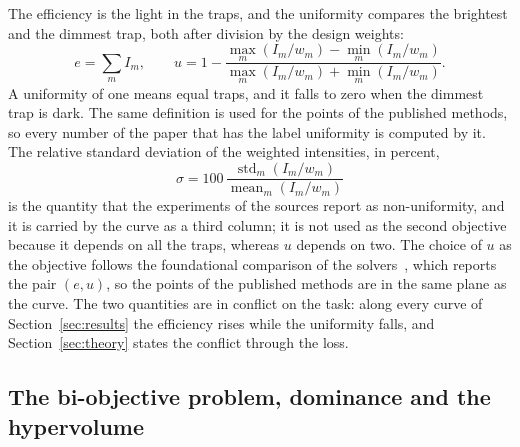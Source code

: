 The efficiency is the light in the traps, and the uniformity compares the brightest and the dimmest trap, both after division by the design weights:
\begin{equation}
e=\sum_mI_m,\qquad u=1-\frac{\max_m(I_m/w_m)-\min_m(I_m/w_m)}{\max_m(I_m/w_m)+\min_m(I_m/w_m)}.\label{eq:eu}
\end{equation}
A uniformity of one means equal traps, and it falls to zero when the dimmest trap is dark. The same definition is used for the points of the published methods, so every number of the paper that has the label uniformity is computed by it. The relative standard deviation of the weighted intensities, in percent,
\begin{equation}
\sigma=100\,\frac{\operatorname{std}_m(I_m/w_m)}{\operatorname{mean}_m(I_m/w_m)}\label{eq:sigma}
\end{equation}
is the quantity that the experiments of the sources report as non-uniformity, and it is carried by the curve as a third column; it is not used as the second objective because it depends on all the traps, whereas $u$ depends on two. The choice of $u$ as the objective follows the foundational comparison of
the solvers~\cite{dileonardo}, which reports the pair $(e,u)$, so the points of the published methods are in the same plane as the curve. The two quantities are in conflict on the task: along every curve of Section~\ref{sec:results} the efficiency rises while the uniformity falls, and Section~\ref{sec:theory} states the conflict through the loss.

\subsection{The bi-objective problem, dominance and the hypervolume}

